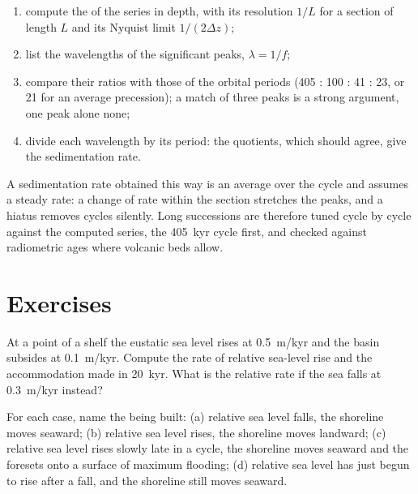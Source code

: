 \begin{method}\label{met:b3:sequence-stratigraphy:cycles}
\begin{enumerate}
\item compute the  of the series in depth, with its resolution
  $1/L$ for a section of length $L$ and its Nyquist limit $1/(2\Delta z)$;
\item list the wavelengths of the significant peaks, $\lambda = 1/f$;
\item compare their ratios with those of the orbital periods (405 : 100 : 41
  : 23, or 21 for an average precession); a match of three peaks is a strong
  argument, one peak alone none;
\item divide each wavelength by its period: the quotients, which should
  agree, give the sedimentation rate.
\end{enumerate}
\end{method}

A sedimentation rate obtained this way is an average over the cycle and
assumes a steady rate: a change of rate within the section stretches the
peaks, and a hiatus removes cycles silently. Long successions are therefore
tuned cycle by cycle against the computed series, the \qty{405}{kyr} cycle
first, and checked against radiometric ages where volcanic beds allow.

\section{Exercises}

\begin{exercise}[$\star$]\label{exo:b3:sequence-stratigraphy:1}
At a point of a shelf the eustatic sea level rises at \qty{0.5}{m/kyr} and
the basin subsides at \qty{0.1}{m/kyr}. Compute the rate of relative
sea-level rise and the accommodation made in \qty{20}{kyr}. What is the
relative rate if the sea falls at \qty{0.3}{m/kyr} instead?
\end{exercise}

\begin{exercise}[$\star$]\label{exo:b3:sequence-stratigraphy:2}
For each case, name the  being built: (a) relative sea level
falls, the shoreline moves seaward; (b) relative sea level rises, the
shoreline moves landward; (c) relative sea level rises slowly late in a
cycle, the shoreline moves seaward and the foresets  onto a surface
of maximum flooding; (d) relative sea level has just begun to rise after a
fall, and the shoreline still moves seaward.
\end{exercise}

